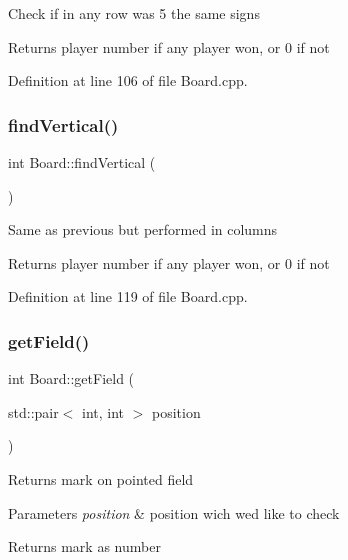 Check if in any row was 5 the same signs \begin{DoxyReturn}{Returns}
player number if any player won, or 0 if not 
\end{DoxyReturn}


Definition at line 106 of file Board.\+cpp.

\mbox{\label{classBoard_a4ee8b912055e8705e37a9b37125b70f0}} 
\subsubsection{\texorpdfstring{find\+Vertical()}{findVertical()}}
{\footnotesize\ttfamily int Board\+::find\+Vertical (\begin{DoxyParamCaption}{ }\end{DoxyParamCaption})\hspace{0.3cm}{\ttfamily [private]}}

Same as previous but performed in columns \begin{DoxyReturn}{Returns}
player number if any player won, or 0 if not 
\end{DoxyReturn}


Definition at line 119 of file Board.\+cpp.

\mbox{\label{classBoard_a2e57d7f5e62b0d870fb3ff1b76eb18ba}} 
\subsubsection{\texorpdfstring{get\+Field()}{getField()}}
{\footnotesize\ttfamily int Board\+::get\+Field (\begin{DoxyParamCaption}\item[{std\+::pair$<$ int, int $>$}]{position }\end{DoxyParamCaption})}

Returns mark on pointed field 
\begin{DoxyParams}{Parameters}
{\em position} & position wich we\textquotesingle{}d like to check \\
\hline
\end{DoxyParams}
\begin{DoxyReturn}{Returns}
mark as number 
\end{DoxyReturn}


